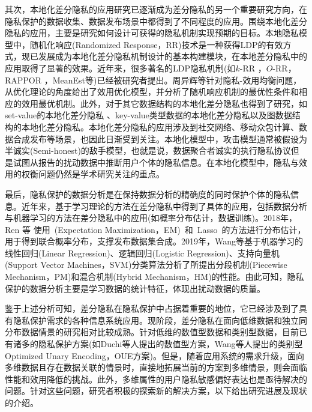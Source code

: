 其次，本地化差分隐私的应用研究\cite{yeqingqing2018}已逐渐成为差分隐私的另一个重要研究方向，在隐私保护的数据收集、数据发布场景中都得到了不同程度的应用。围绕本地化差分隐私的应用，主要是研究如何设计可获得的隐私机制实现预期的目标。本地隐私模型中，随机化响应(Randomized Response，RR)\cite{warner1965randomized}技术是一种获得LDP的有效方式，现已发展成为本地化差分隐私机制设计的基本构建模块，在本地差分隐私中的应用取得了显著的效果。近年来，很多著名的LDP隐私机制(如$k$-RR \cite{kairouz2016extremal}，$O$-RR\cite{kairouz2016discrete}，RAPPOR \cite{erlingsson2014rappor,fanti2016building}，MeanEst\cite{duchi2013localprivacy}等)已经被研究者提出。周异辉等\cite{zhouyihui2019}针对隐私-效用均衡问题，从优化理论的角度给出了效用优化模型，并分析了随机响应机制的最优性条件和相应的效用最优机制。此外，对于其它数据结构的本地化差分隐私也得到了研究，如set-value的本地化差分隐私
\cite{wang2018privset,qin2016heavy}、key-value类型数据的本地化差分隐私\cite{ye2019privkv}以及图数据结构的本地化差分隐私\cite{wei2020asgldp}。本地化差分隐私的应用涉及到社交网络\cite{qin2017generating}、移动众包计算\cite{sei2017differential}、数据合成发布\cite{ren2018textsf,yang2017copula}等场景，也因此日渐受到关注。本地化模型中，攻击模型通常被假设为半诚实(Semi-honest)的敌手模型，也就是说，数据聚合者诚实的执行隐私协议但是试图从报告的扰动数据中推断用户个体的隐私信息\cite{sei2017differential}。在本地化模型中，隐私与效用的权衡问题仍然是学术研究关注的重点。

最后，隐私保护的数据分析是在保持数据分析的精确度的同时保护个体的隐私信息\cite{wang2016on}。近年来，基于学习理论的方法在差分隐私中得到了具体的应用，包括数据分析与机器学习的方法在差分隐私中的应用\cite{kasiviswanathan2011what,ye2017optimal,sarwate2013signal}(如概率分布估计\cite{Murakami2018Toward}，数据训练\cite{xu2019ganobfuscator})。2018年，Ren 等\cite{ren2018textsf} 使用~(Expectation Maximization，EM)~和~Lasso~的方法进行分布估计，用于得到联合概率分布，支撑发布数据集合成。2019年，Wang等\cite{wang2019collecting}基于机器学习的线性回归(Linear Regression)、逻辑回归(Logistic Regression)、支持向量机(Support Vector Machines，SVM)分类算法分析了所提出分段机制(Piecewise Mechanism，PM)和混合机制(Hybrid Mechanism，HM)的性能。由此可知，隐私保护的数据分析主要是学习数据的统计特征，体现出扰动数据的质量。

鉴于上述分析可知，差分隐私在隐私保护中占据着重要的地位，它已经涉及到了具有隐私保护需求的各种信息系统应用。现阶段，差分隐私在面向低维数据和独立同分布数据情景的研究相对比较成熟。针对低维的数值型数据和类别型数据，目前已有诸多的隐私保护方案(如Duchi等人\cite{duchi2018minimax}提出的数值型方案，Wang等人\cite{wang2017locally}提出的类别型Optimized Unary Encoding，OUE方案)。但是，随着应用系统的需求升级，面向多维数据且存在数据关联的情景时，直接地拓展当前的方案到多维情景，则会面临性能和效用降低的挑战。此外，多维属性的用户隐私敏感偏好表达也是亟待解决的问题。针对这些问题，研究者积极的探索新的解决方案，以下给出研究进展及现状的介绍。



